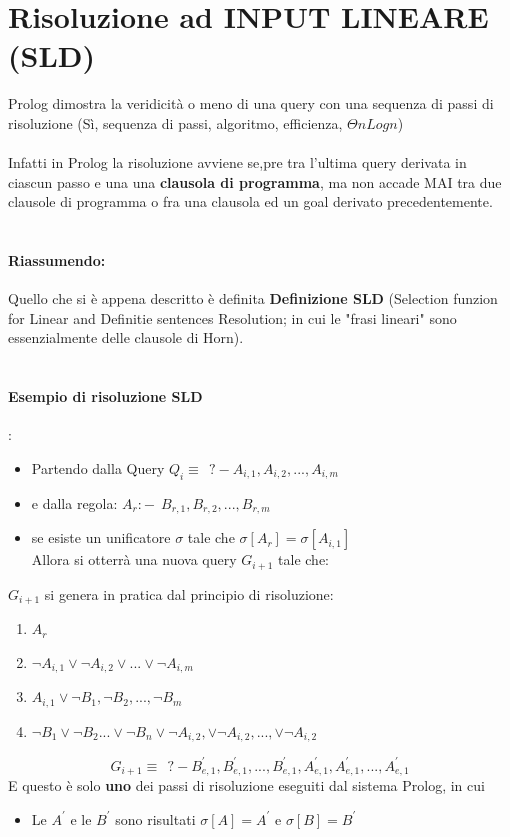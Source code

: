 \documentclass[12pt, a4paper, openany, oneside]{book}
\begin{document}
\section{Risoluzione ad INPUT LINEARE (SLD)}
Prolog dimostra la veridicità o meno di una query con una sequenza di passi di
risoluzione (Sì, sequenza di passi, algoritmo, efficienza, $\Theta nLogn$) 
\\ \\
Infatti in Prolog la risoluzione avviene se,pre tra l'ultima query derivata in 
ciascun passo e una una \textbf{clausola di programma}, ma non accade MAI tra
due clausole di programma o fra una clausola ed un goal derivato precedentemente.
\\ \\
\paragraph{Riassumendo: } Quello che si è appena descritto è definita \textbf{Definizione
SLD} (Selection funzion for Linear and Definitie sentences Resolution; in cui
le "frasi lineari" sono essenzialmente delle clausole di Horn).
\\ \\
\paragraph{Esempio di risoluzione SLD}:
\begin{itemize}
	\item Partendo dalla Query $Q_{i} \equiv ~~ ?- A_{i,1}, A_{i,2}, ..., A_{i,m}$
	\item e dalla regola: $A_{r} :- ~~ B_{r,1}, B_{r,2}, ..., B_{r,m}$
	\item se esiste un unificatore $\sigma$ tale che $\sigma[A_{r}] = 
	\sigma[A_{i,1}]$ \\
	Allora si otterrà una nuova query $G_{i+1}$ tale che: 
\end{itemize}
$G_{i+1}$ si genera in pratica dal principio di risoluzione:
\begin{enumerate}
	\item $A_{r}$
	\item $\neg A_{i,1} \vee \neg A_{i,2}\vee ...\vee \neg A_{i,m}$ 
	\item $A_{i,1} \vee \neg B_{1}, \neg B_{2}, ..., \neg B_{m}$
	\item $\neg B_{1} \vee \neg B_{2} ... \vee \neg B_{n} \vee \neg A_{i,2},
	\vee \neg A_{i,2}, ..., \vee \neg A_{i,2}$
\end{enumerate}
$$G_{i+1} \equiv ~~ ?- B_{e,1}^{'}, B_{e,1}^{'}, ..., B_{e,1}^{'}, A_{e,1}^{'}, 
A_{e,1}^{'}, ..., A_{e,1}^{'} $$
E questo è solo \textbf{uno} dei passi di risoluzione eseguiti dal sistema Prolog,
in cui \begin{itemize}
\item Le $A^{'}$ e le $B^{'}$ sono risultati $\sigma[A] = A^{'}$ e 
$\sigma[B] = B^{'}$
\end{itemize}
\end{document}
